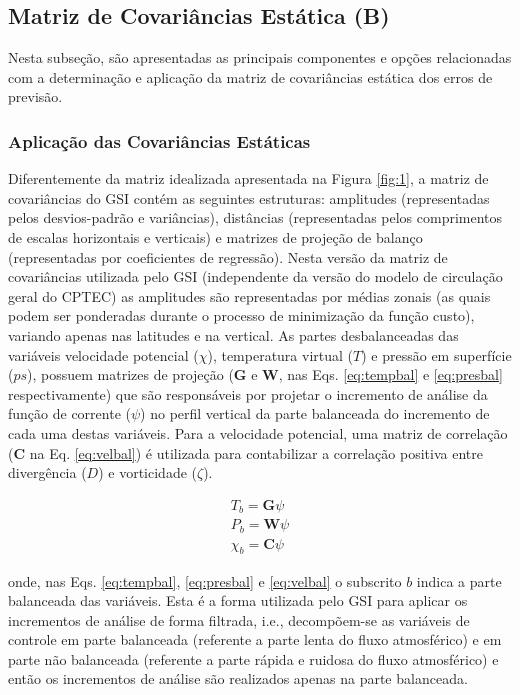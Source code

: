 \subsection{Matriz de Covariâncias Estática (B)}

Nesta subseção, são apresentadas as principais componentes e opções relacionadas com a determinação e aplicação da matriz de covariâncias estática dos erros de previsão.

\subsubsection*{Aplicação das Covariâncias Estáticas}

Diferentemente da matriz idealizada apresentada na Figura \ref{fig:1}, a matriz de covariâncias do GSI contém as seguintes estruturas: amplitudes (representadas pelos desvios-padrão e variâncias), distâncias (representadas pelos comprimentos de escalas horizontais e verticais) e matrizes de projeção de balanço (representadas por coeficientes de regressão). Nesta versão da matriz de covariâncias utilizada pelo GSI (independente da versão do modelo de circulação geral do CPTEC) as amplitudes são representadas por médias zonais (as quais podem ser ponderadas durante o processo de minimização da função custo), variando apenas nas latitudes e na vertical. As partes desbalanceadas das variáveis velocidade potencial ($\chi$), temperatura virtual ($T$) e pressão em superfície ($ps$), possuem matrizes de projeção ($\mathbf{G}$ e $\mathbf{W}$, nas Eqs. \ref{eq:tempbal} e \ref{eq:presbal} respectivamente) que são responsáveis por projetar o incremento de análise da função de corrente ($\psi$) no perfil vertical da parte balanceada do incremento de cada uma destas variáveis. Para a velocidade potencial, uma matriz de correlação ($\mathbf{C}$ na Eq. \ref{eq:velbal}) é utilizada para contabilizar a correlação positiva entre divergência ($D$) e vorticidade ($\zeta$). 

\begin{align}
\label{eq:tempbal}
    T_{b}=\mathbf{G}\psi \\
\label{eq:presbal}
    P_{b}=\mathbf{W}\psi \\
\label{eq:velbal}
    \chi_{b}=\mathbf{C}\psi
\end{align}

onde, nas Eqs. \ref{eq:tempbal}, \ref{eq:presbal} e \ref{eq:velbal} o subscrito $b$ indica a parte balanceada das variáveis. Esta é a forma utilizada pelo GSI para aplicar os incrementos de análise de forma filtrada, i.e., decompõem-se as variáveis de controle em parte balanceada (referente a parte lenta do fluxo atmosférico) e em parte não balanceada (referente a parte rápida e ruidosa do fluxo atmosférico) e então os incrementos de análise são realizados apenas na parte balanceada.

